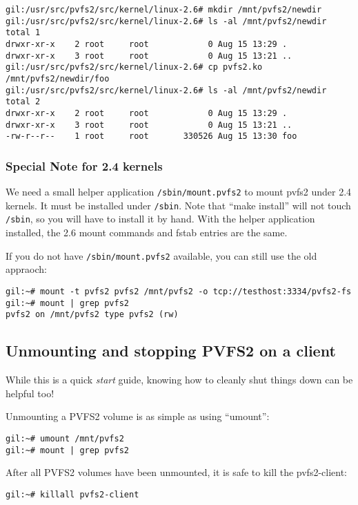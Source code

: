 \documentclass[11pt, letterpaper]{article}
\begin{document}
\begin{verbatim}
gil:/usr/src/pvfs2/src/kernel/linux-2.6# mkdir /mnt/pvfs2/newdir
gil:/usr/src/pvfs2/src/kernel/linux-2.6# ls -al /mnt/pvfs2/newdir
total 1
drwxr-xr-x    2 root     root            0 Aug 15 13:29 .
drwxr-xr-x    3 root     root            0 Aug 15 13:21 ..
gil:/usr/src/pvfs2/src/kernel/linux-2.6# cp pvfs2.ko
/mnt/pvfs2/newdir/foo
gil:/usr/src/pvfs2/src/kernel/linux-2.6# ls -al /mnt/pvfs2/newdir
total 2
drwxr-xr-x    2 root     root            0 Aug 15 13:29 .
drwxr-xr-x    3 root     root            0 Aug 15 13:21 ..
-rw-r--r--    1 root     root       330526 Aug 15 13:30 foo
\end{verbatim}

\subsubsection{Special Note for 2.4 kernels}

We need a small helper application \texttt{/sbin/mount.pvfs2} to mount pvfs2
under 2.4 kernels.   It must be installed under \texttt{/sbin}.  Note that
``make install'' will not touch \texttt{/sbin}, so you will have to install it
by hand.  With the helper application installed, the 2.6 mount commands and
fstab entries are the same.  

If you do not have \texttt{/sbin/mount.pvfs2} available, you can still use the
old appraoch:

\begin{verbatim}
gil:~# mount -t pvfs2 pvfs2 /mnt/pvfs2 -o tcp://testhost:3334/pvfs2-fs
gil:~# mount | grep pvfs2
pvfs2 on /mnt/pvfs2 type pvfs2 (rw)
\end{verbatim}


\subsection{Unmounting and stopping PVFS2 on a client}

While this is a quick \emph{start} guide, knowing how to cleanly shut
things down can be helpful too!

Unmounting a PVFS2 volume is as simple as using ``umount'':
\begin{verbatim}
gil:~# umount /mnt/pvfs2
gil:~# mount | grep pvfs2
\end{verbatim}

After all PVFS2 volumes have been unmounted, it is safe to kill the
pvfs2-client:
\begin{verbatim}
gil:~# killall pvfs2-client
\end{verbatim}
\end{document}
